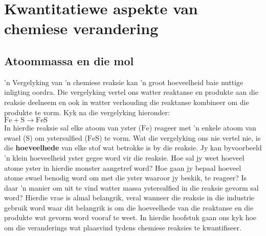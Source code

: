          \chapter{Kwantitatiewe aspekte van chemiese verandering }\label{chap:quanchem}
    \setcounter{figure}{1}
    \setcounter{subfigure}{1}
    \label{0044f0dab6cfd2ca2bac282dc4009886}
         \section{Atoommassa en die mol}
    \nopagebreak

 'n Vergelyking van 'n chemiese reaksie kan  'n groot hoeveelheid baie nuttige inligting oordra. Die vergelyking vertel ons watter reaktanse en produkte aan die reaksie deelneem en ook in watter verhouding die reaktanse kombineer om die produkte te vorm. Kyk na die vergelyking hieronder:\\

        $\text{Fe}+\text{S}\to \text{FeS}$\\
In hierdie reaksie sal elke atoom van yster ($\text{Fe}$) reageer met 'n enkele atoom van swael ($\text{S}$) om ystersulfied ($\text{FeS}$) te vorm. Wat die vergelyking ons nie vertel nie, is die \textbf{hoeveelhede} van elke stof wat betrokke is by die reaksie. Jy kan byvoorbeeld 'n klein hoeveelheid yster gegee word vir die reaksie. Hoe sal jy weet hoeveel atome yster in hierdie monster aangetref word? Hoe gaan jy bepaal hoeveel atome swael benodig word om met die yster waaroor jy beskik, te reageer? Is daar 'n manier om uit te vind watter massa ystersulfied in die reaksie gevorm sal word? Hierdie vrae is almal belangrik, veral wanneer die reaksie in die industrie gebruik word waar dit belangrik is om die hoeveelhede van die reaktanse en die produkte wat gevorm word vooraf te weet. In hierdie  hoofstuk gaan ons kyk hoe om die veranderings wat plaasvind tydens chemiese reaksies te kwantifiseer.
